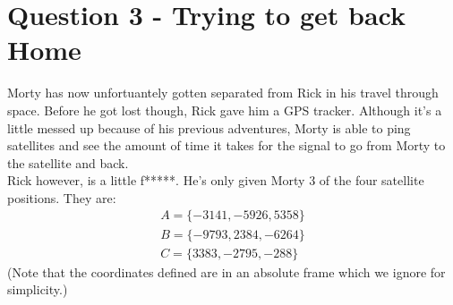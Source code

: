 \documentclass[a4paper, 12pt]{exam}
\begin{document}
	\pagebreak
	
	\section*{Question 3 - Trying to get back Home}
	Morty has now unfortuantely gotten separated from Rick in his travel through space. Before he got lost though, Rick gave him a GPS tracker. Although it's a little messed up because of his previous adventures, Morty is able to ping satellites and see the amount of time it takes for the signal to go from Morty to the satellite and back. \\
	Rick however, is a little f*****. He's only given Morty 3 of the four satellite positions. They are:
	\begin{align*}
		A = \{-3141, -5926, 5358\}\\
		B = \{-9793, 2384, -6264\}\\
		C = \{3383, -2795, -288\}
	\end{align*}
	(Note that the coordinates defined are in an absolute frame which we ignore for simplicity.)
\end{document}
